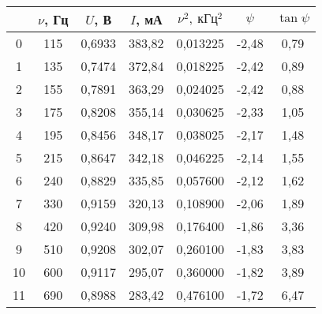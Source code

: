 \begin{table}
\centering
\begin{tabular}{|c|c|c|c|c|c|c|}
\hline
 & $\nu$, Гц & $U$, В & $I$, мА & $\nu^2,\ кГц^2$ & $\psi$ & $\tan{\psi}$ \\
\hline
0 & 115 & 0,6933 & 383,82 & 0,013225 & -2,48 & 0,79 \\
\cline{1-7}
1 & 135 & 0,7474 & 372,84 & 0,018225 & -2,42 & 0,89 \\
\cline{1-7}
2 & 155 & 0,7891 & 363,29 & 0,024025 & -2,42 & 0,88 \\
\cline{1-7}
3 & 175 & 0,8208 & 355,14 & 0,030625 & -2,33 & 1,05 \\
\cline{1-7}
4 & 195 & 0,8456 & 348,17 & 0,038025 & -2,17 & 1,48 \\
\cline{1-7}
5 & 215 & 0,8647 & 342,18 & 0,046225 & -2,14 & 1,55 \\
\cline{1-7}
6 & 240 & 0,8829 & 335,85 & 0,057600 & -2,12 & 1,62 \\
\cline{1-7}
7 & 330 & 0,9159 & 320,13 & 0,108900 & -2,06 & 1,89 \\
\cline{1-7}
8 & 420 & 0,9240 & 309,98 & 0,176400 & -1,86 & 3,36 \\
\cline{1-7}
9 & 510 & 0,9208 & 302,07 & 0,260100 & -1,83 & 3,83 \\
\cline{1-7}
10 & 600 & 0,9117 & 295,07 & 0,360000 & -1,82 & 3,89 \\
\cline{1-7}
11 & 690 & 0,8988 & 283,42 & 0,476100 & -1,72 & 6,47 \\
\cline{1-7}
\hline
\end{tabular}
\end{table}

